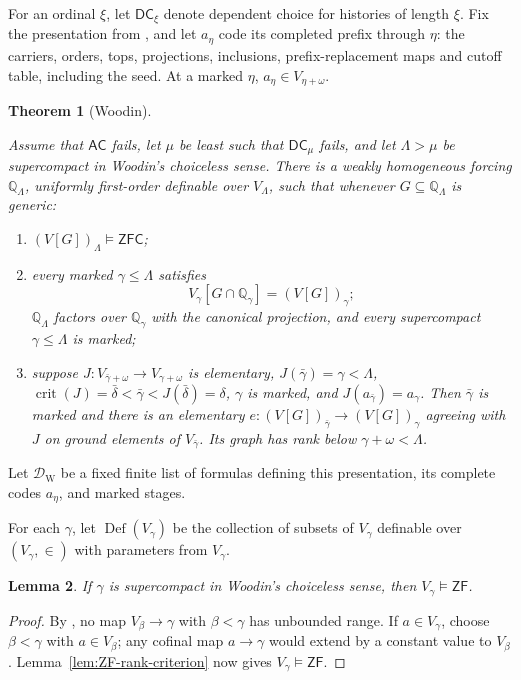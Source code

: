 \documentclass[11pt,a4paper]{amsart}
\newcommand{\AC}{\mathsf{AC}}
\newcommand{\ZF}{\mathsf{ZF}}
\newcommand{\ZFC}{\mathsf{ZFC}}
\newcommand{\Def}{\operatorname{Def}}
\newcommand{\DC}{\mathsf{DC}}
\newcommand{\crit}{\operatorname{crit}}
\theoremstyle{plain}
\newtheorem{theorem}{Theorem}[section]
\newtheorem{lemma}[theorem]{Lemma}
\theoremstyle{definition}
\theoremstyle{remark}
\begin{document}
For an ordinal $\xi$, let $\DC_\xi$ denote dependent choice for histories of length $\xi$.  Fix the presentation from \cite[Section~3]{Supplement}, and let $a_\eta$ code its completed prefix through $\eta$: the carriers, orders, tops, projections, inclusions, prefix-replacement maps and cutoff table, including the seed.  At a marked $\eta$, $a_\eta\in V_{\eta+\omega}$.

\begin{theorem}[Woodin]\label{thm:Woodin-forcing}

Assume that $\AC$ fails, let $\mu$ be least such that $\DC_\mu$ fails, and let $\Lambda>\mu$ be supercompact in Woodin's choiceless sense.  There is a weakly homogeneous forcing $\mathbb Q_\Lambda$, uniformly first-order definable over $V_\Lambda$, such that whenever $G\subseteq\mathbb Q_\Lambda$ is generic:

\begin{enumerate}
\item $(V[G])_\Lambda\models\ZFC$;
\item {every marked $\gamma\leq\Lambda$ satisfies
\[
V_\gamma[G\cap\mathbb Q_\gamma]=(V[G])_\gamma;
\]
$\mathbb Q_\Lambda$ factors over $\mathbb Q_\gamma$ with the canonical projection, and every supercompact $\gamma\leq\Lambda$ is marked;}
\item suppose $J:V_{\bar\gamma+\omega}\to V_{\gamma+\omega}$ is elementary, $J(\bar\gamma)=\gamma<\Lambda$, $\crit(J)=\bar\delta<\bar\gamma<J(\bar\delta)=\delta$, $\gamma$ is marked, and $J(a_{\bar\gamma})=a_\gamma$.  Then $\bar\gamma$ is marked and there is an elementary $e:(V[G])_{\bar\gamma}\longrightarrow(V[G])_\gamma$ agreeing with $J$ on ground elements of $V_{\bar\gamma}$.  Its graph has rank below $\gamma+\omega<\Lambda$.
\end{enumerate}
\end{theorem}

Let $\mathcal D_{\mathrm W}$ be a fixed finite list of formulas defining this presentation, its complete codes $a_\eta$, and marked stages.

For each $\gamma$, let $\Def(V_\gamma)$ be the collection of subsets of $V_\gamma$ definable over $(V_\gamma,\in)$ with parameters from $V_\gamma$.

\begin{lemma}\label{lem:supercompact-rank-ZF}
If $\gamma$ is supercompact in Woodin's choiceless sense, then $V_\gamma\models\ZF$.
\end{lemma}

\begin{proof}

By \cite[Definition~19 and the proof of Theorem~44]{Spoerl}, no map $V_\beta\to\gamma$ with $\beta<\gamma$ has unbounded range.  If $a\in V_\gamma$, choose $\beta<\gamma$ with $a\in V_\beta$; any cofinal map $a\to\gamma$ would extend by a constant value to $V_\beta$.  Lemma~\ref{lem:ZF-rank-criterion} now gives $V_\gamma\models\ZF$.
\end{proof}
\end{document}
